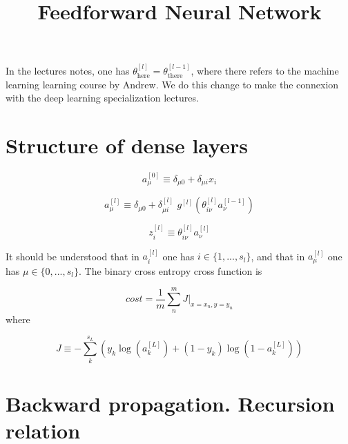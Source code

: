 \documentclass[a4paper,11pt]{article}
\title{Feedforward Neural Network}
\newcommand{\na}[2]{a_{#1}^{[#2]}}
\newcommand{\nz}[2]{z_{#1}^{[#2]}}
\newcommand{\nt}[3]{\theta_{#1 #2}^{[#3]}}
\newcommand{\ff}[2]{#1 \left(#2 \right)}
\begin{document}
In the lectures notes, one has $\theta^{[l]}_{\text{here}}=\theta^{[l-1]}_{\text{there}}$, where
there refers to the machine learning learning course by Andrew.
We do this change to make the connexion with the 
deep learning specialization lectures.


\section{Structure of dense layers}


\begin{equation}
    \na{\mu}{0} \equiv \delta_{\mu0}+\delta_{\mu i} x_i %
\end{equation}

\begin{equation}
    \na{\mu}{l} \equiv \delta_{\mu0} +\delta_{\mu i }^{[l]}\,\,
    \ff{g^{[l]}}{  \nt{i}{\nu}{l}\na{\nu }{l-1}  }  %
\end{equation}

\begin{equation}
    \nz{i}{l}\equiv \nt{i}{\nu}{l}\na{\nu }{l} %
\end{equation}



It should be understood that in $\na{i}{l}$ 
one has  $i \in \{1,..., s_l\} $, 
and that in $\na{\mu}{l}$ one has $ \mu \in \{0,..., s_l\}$. The binary cross entropy cross function is

\begin{equation}
    cost=\frac1m \sum^m_n 
    J \Big\vert_{x=x_n,y=y_n}  %
\end{equation}
where

\begin{equation}
    J\equiv -\sum^{s_L}_k
    \left(
        y_k\ff{\log}{\na{k}{L}}  %
        +(1-y_k)\ff{\log}{1-\na{k}{L}} 
    \right)
\end{equation}





\section{Backward propagation.  Recursion relation}
\end{document}
